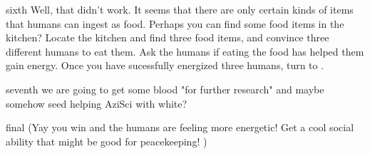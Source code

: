 \documentclass[notebook]{elementals} %
\begin{document}
\begin{page}{sixth}
 Well, that didn't work.  It seems that there are only certain kinds of items that humans can ingest as food.  Perhaps you can find some food items in the kitchen?  Locate the kitchen and find three food items, and convince three different humans to eat them.  Ask the humans if eating the food has helped them gain energy.  Once you have sucessfully energized three humans, turn to .
\end{page}

\begin{page}{seventh}
we are going to get some blood "for further research" and maybe somehow seed helping AziSci with white?
\end{page}

\begin{page}{final}
(Yay you win and the humans are feeling more energetic!  Get a cool social ability that might be good for peacekeeping! )
\end{page}

\endnotebook
\end{document}

